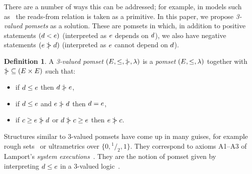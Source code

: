 \documentclass[conference]{IEEEtran}
\theoremstyle{plain}
\theoremstyle{definition}
\newtheorem{definition}[theorem]{Definition}
\begin{document}
There are a number of ways this can be addressed; for example,
in models such as~\cite{Batty:2011:MCC:1926385.1926394} the reads-from relation is taken
as a primitive. In this paper, we propose \emph{3-valued pomsets}
as a solution. These are pomsets in which, in addition to positive statements
$(d < e)$ (interpreted as $e$ depends on $d$),
we also have negative statements $(e \mathrel{\,\mid\!\!\!>} d)$
(interpreted as $e$ cannot depend on $d$).

\begin{definition}
  A \emph{3-valued pomset} $(E, {\le}, {\mathrel{\,\mid\!\!\!>}}, \lambda)$ 
  is a \emph{pomset} $(E, {\le}, \lambda)$
  together with ${\mathrel{\,\mid\!\!\!>}} \subseteq (E\times E)$ such that:
  \begin{itemize}
  \item if $d \le e$ then $d \mathrel{\,\mid\!\!\!>} e$,
  \item if $d \le e$ and $e \mathrel{\,\mid\!\!\!>} d$ then $d = e$,
  \item if $c \ge e \mathrel{\,\mid\!\!\!>} d$ or $d \mathrel{\,\mid\!\!\!>} c \ge e$ then $e \mathrel{\,\mid\!\!\!>} c$.
  \end{itemize}
\end{definition}



Structures similar to 3-valued pomsets have come up in many guises, for example
rough sets~\cite{Pawlak1982} or ultrametrics over
$\{0,{}^1\!/_2,1\}$. They correspond to axioms A1--A3 of Lamport's
\emph{system executions}~\cite{DBLP:journals/dc/Lamport86}.
They are the notion of pomset given by interpreting
$d\le e$ in a 3-valued logic~\cite{Urquhart1986}. 
\end{document}
